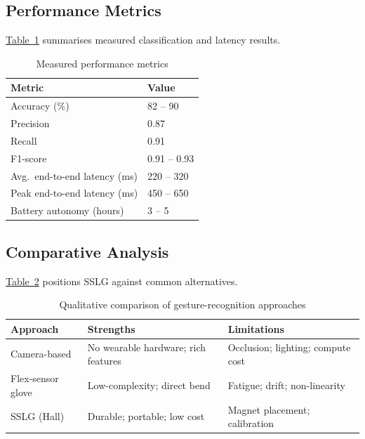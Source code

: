 \documentclass[conference]{IEEEtran}
\newcommand{\TabLink}[1]{\hyperref[#1]{Table~\ref*{#1}}}
\newcommand{\SystemAcronym}{SSLG }
\begin{document}
\subsection{Performance Metrics}

\TabLink{tab:metrics} summarises measured classification and latency results.

\begin{table}[!t]
  \centering\caption{Measured performance metrics}\label{tab:metrics}
  \begin{tabularx}{\columnwidth}{@{}lX@{}}
    \toprule Metric & Value \\\midrule
    Accuracy (\%)                 & 82 -- 90 \\
    Precision                     & 0.87 \\
    Recall                        & 0.91 \\
    F1-score                      & 0.91 -- 0.93 \\
    Avg.\ end-to-end latency (ms) & 220 -- 320 \\
    Peak end-to-end latency (ms)  & 450 -- 650 \\
    Battery autonomy (hours)      & 3 -- 5 \\
    \bottomrule
  \end{tabularx}
\end{table}

\subsection{Comparative Analysis}

\TabLink{tab:comparison} positions \SystemAcronym against common alternatives.

\begin{table}[!t]
  \centering\caption{Qualitative comparison of gesture-recognition approaches}
  \label{tab:comparison}
  \begin{tabularx}{\columnwidth}{@{}>{\raggedright\arraybackslash}p{}XX@{}}
    \toprule Approach & Strengths & Limitations \\\midrule
    Camera-based &
      No wearable hardware; rich features &
      Occlusion; lighting; compute cost~\cite{mitra} \\
    Flex-sensor glove &
      Low-complexity; direct bend &
      Fatigue; drift; non-linearity \\
    \SystemAcronym{} (Hall) &
      Durable; portable; low cost &
      Magnet placement; calibration \\
    \bottomrule
  \end{tabularx}
\end{table}
\end{document}
